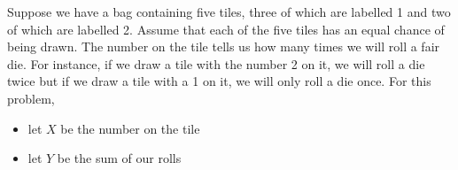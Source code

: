 \documentclass[addpoints]{examsetup}\usepackage[]{graphicx}\usepackage[]{color}
\begin{document}
\begin{questions}

\newpage

\question

Suppose we have a bag containing five tiles, three of which are labelled 1 and two of which are labelled 2.
Assume that each of the five tiles has an equal chance of being drawn.
The number on the tile tells us how many times we will roll a fair die.
For instance, if we draw a tile with the number 2 on it, we will roll a die twice but if we draw a tile with a 1 on it, we will only roll a die once.
For this problem, 
\begin{itemize}
   \item let $X$ be the number on the tile 
   \item let $Y$ be the sum of our rolls \\
\end{itemize}

\end{questions}
\end{document}
